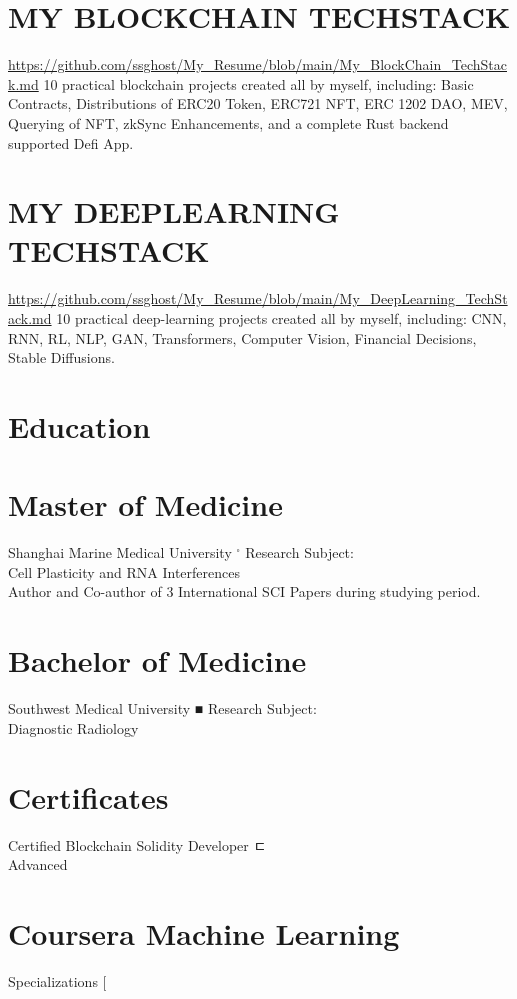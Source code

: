 \documentclass[10pt]{article}
\begin{document}
\section*{MY BLOCKCHAIN TECHSTACK}
\href{https://github.com/ssghost/My_Resume/blob/main/My_BlockChain_TechStack.md}{https://github.com/ssghost/My\_Resume/blob/main/My\_BlockChain\_TechStack.md} 10 practical blockchain projects created all by myself, including: Basic Contracts, Distributions of ERC20 Token, ERC721 NFT, ERC 1202 DAO, MEV, Querying of NFT, zkSync Enhancements, and a complete Rust backend supported Defi App.

\section*{MY DEEPLEARNING TECHSTACK}
\href{https://github.com/ssghost/My_Resume/blob/main/My_DeepLearning_TechStack.md}{https://github.com/ssghost/My\_Resume/blob/main/My\_DeepLearning\_TechStack.md} 10 practical deep-learning projects created all by myself, including: CNN, RNN, RL, NLP, GAN, Transformers, Computer Vision, Financial Decisions, Stable Diffusions.

\section*{Education}
\section*{Master of Medicine}
Shanghai Marine Medical University ${ }^{\square}$ Research Subject:\\
Cell Plasticity and RNA Interferences\\
Author and Co-author of 3 International SCI Papers during studying period.

\section*{Bachelor of Medicine}
Southwest Medical University ■ Research Subject:\\
Diagnostic Radiology

\section*{Certificates}
Certified Blockchain Solidity Developer ㄷ\\
Advanced

\section*{Coursera Machine Learning}
Specializations $[$
\end{document}
